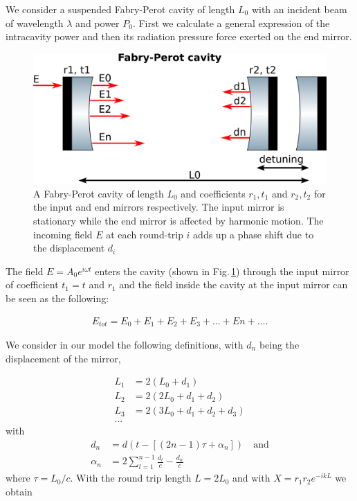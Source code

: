 We consider a suspended Fabry-Perot cavity of length $L_0$ %
with an incident beam of wavelength $\lambda$ and power $P_0$.
First we calculate a general expression of the intracavity power and then its  radiation pressure force exerted on the end mirror.\\


\begin{figure}[htbp]
	\centering
		\includegraphics[width=.7\textwidth]{figures/theory/cavity_paper.pdf}
	\caption[A Fabry-Perot cavity]{A Fabry-Perot cavity of length $L_0$ and coefficients $r_1,t_1$ and $r_2,t_2$ for the input and end mirrors respectively. 
	The input mirror is stationary while the end mirror is affected by harmonic motion. The incoming field $E$ at each round-trip $i$ adds up a phase shift due to the displacement $d_i$}
	\label{fig:cavity_k}
\end{figure}


The field $E=A_0e^{i\omega t}$ enters the cavity (shown in Fig.\,\ref{fig:cavity_k}) through the input mirror of coefficient $t_1=t$ and $r_1$ and the field inside the cavity at the input mirror can be seen as the following:

\begin{align}
E_{tot}=E_0+E_1+E_2+E_3+...+En+... .
\end{align}


We consider in our model the following definitions, with $d_n$ being the displacement of the mirror,

\begin{align}
L_1&=2(L_0+d_1)\nonumber\\
L_2&=2(2L_0+d_1+d_2)\nonumber\\
L_3&=2(3L_0+d_1+d_2+d_3)\nonumber \\ %
...
\end{align}
with 
\begin{align}
\label{eqn:dn1}
d_n &= d(t-[(2n-1)\tau + \alpha_n ]) \quad \mbox{and}\\
\label{eqn:dn2}
\alpha_n &= 2\sum\limits_{l=1}^{n-1}\frac{d_l}{c}-\frac{d_n}{c}
\end{align}
where $\tau=L_0/c$.
With the round trip length $L=2L_0$ and with $X=r_1r_2 e^{-ikL}$ we obtain

